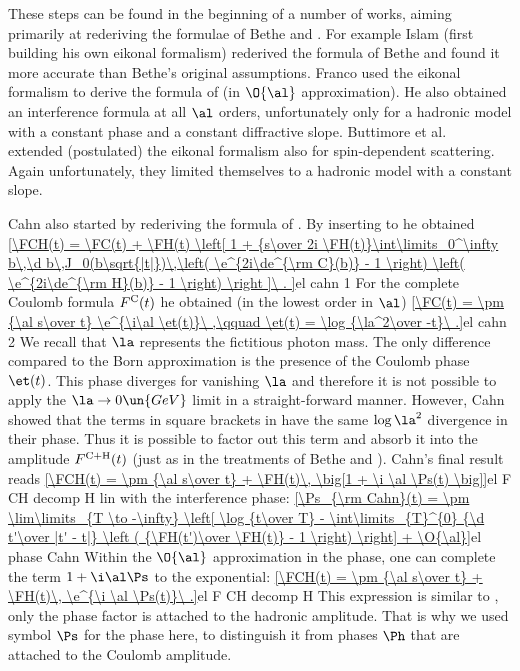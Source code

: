 These steps can be found in the beginning of a number of works, aiming primarily at rederiving the formulae of Bethe  and \WY{} .
  For example Islam  (first building his own eikonal formalism) rederived the formula of Bethe and found it more accurate than Bethe's original assumptions.
  Franco  used the eikonal formalism to derive the formula of \WY{} (in $\O{\al}$ approximation). He also obtained an interference formula at all $\al$ orders, unfortunately only for a hadronic model with a constant phase and a constant diffractive slope.
  Buttimore et al.~ extended (postulated) the eikonal formalism also for spin-dependent scattering. Again unfortunately, they limited themselves to a hadronic model with a constant slope.

Cahn  also started by rederiving the formula of \WY. By inserting  to  he obtained
\eqref{\FCH(t) = \FC(t)
+ \FH(t) \left[ 1 +
{s\over 2i \FH(t)}\int\limits_0^\infty b\,\d b\,J_0(b\sqrt{|t|})\,\left( \e^{2i\de^{\rm C}(b)} - 1 \right) \left( \e^{2i\de^{\rm H}(b)} - 1 \right)
\right ]\ .
}{el cahn 1}
For the complete Coulomb formula $F^{\rm C}(t)$ he obtained (in the lowest order in $\al$)
\eqref{\FC(t) = \pm {\al s\over t} \e^{\i\al \et(t)}\ ,\qquad \et(t) = \log {\la^2\over -t}\ .}{el cahn 2}
We recall that $\la$ represents the fictitious photon mass. The only difference compared to the Born approximation  is the presence of the Coulomb phase $\et(t)$. This phase diverges for vanishing $\la$ and therefore it is not possible to apply the $\la\to 0\un{GeV}$ limit in a straight-forward manner. However, Cahn showed that the terms in square brackets in  have the same $\log\la^2$ divergence in their phase. Thus it is possible to factor out this term and absorb it into the amplitude $F^{\rm C+H}(t)$ (just as in the treatments of Bethe and \WY). Cahn's final result reads
\eqref{\FCH(t) = \pm {\al s\over t} + \FH(t)\, \big[1 + \i \al \Ps(t) \big]}{el F CH decomp H lin}
with the interference phase:
\eqref{\Ps_{\rm Cahn}(t) = \pm \lim\limits_{T \to -\infty} \left[ \log {t\over T} - \int\limits_{T}^{0} {\d t'\over |t' - t|} \left ( {\FH(t')\over \FH(t)} - 1 \right) \right] + \O{\al}}{el phase Cahn}
Within the $\O{\al}$ approximation in the phase, one can complete the term $1+\i\al\Ps$ to the exponential:
\eqref{\FCH(t) = \pm {\al s\over t} + \FH(t)\, \e^{\i \al \Ps(t)}\ .}{el F CH decomp H}
This expression is similar to , only the phase factor is attached to the hadronic amplitude. That is why we used symbol $\Ps$ for the phase here, to distinguish it from phases $\Ph$ that are attached to the Coulomb amplitude.

